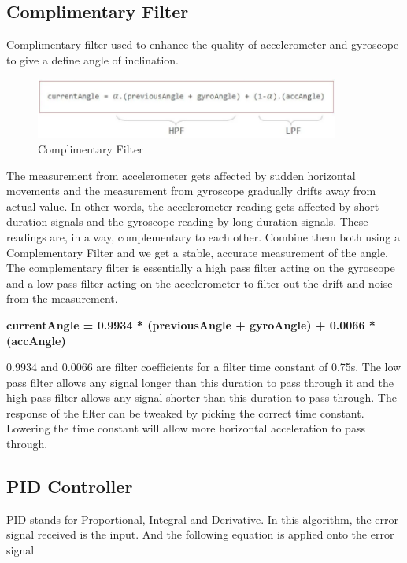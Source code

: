 \documentclass{article}
\begin{document}
 	\subsection{Complimentary Filter}
 	Complimentary filter used to enhance the quality of accelerometer and gyroscope to give a define angle of inclination.
 	
 	\begin{figure}[h]
 		\centering
 		\includegraphics[width=100mm,scale=0.5]{complimentaryfilter}
 		\caption{Complimentary Filter}
 		\label{Complimentary Filter}
 	\end{figure}
 	
 	The measurement from accelerometer gets affected by sudden horizontal movements and the measurement from gyroscope gradually drifts away from actual value. In other words, the accelerometer reading gets affected by short duration signals and the gyroscope reading by long duration signals. These readings are, in a way, complementary to each other. Combine them both using a Complementary Filter and we get a stable, accurate measurement of the angle. The complementary filter is essentially a high pass filter acting on the gyroscope and a low pass filter acting on the accelerometer to filter out the drift and noise from the measurement.
 	
 	\textbf{currentAngle = 0.9934 * (previousAngle + gyroAngle) + 0.0066 * (accAngle)}
 	
 	0.9934 and 0.0066 are filter coefficients for a filter time constant of 0.75s. The low pass filter allows any signal longer than this duration to pass through it and the high pass filter allows any signal shorter than this duration to pass through. The response of the filter can be tweaked by picking the correct time constant. Lowering the time constant will allow more horizontal acceleration to pass through.
 	
 	\subsection{PID Controller}
 	
 	PID stands for Proportional, Integral and Derivative. In this algorithm, the error signal received is the input. And the following equation is applied onto the error signal
 	
\end{document}
